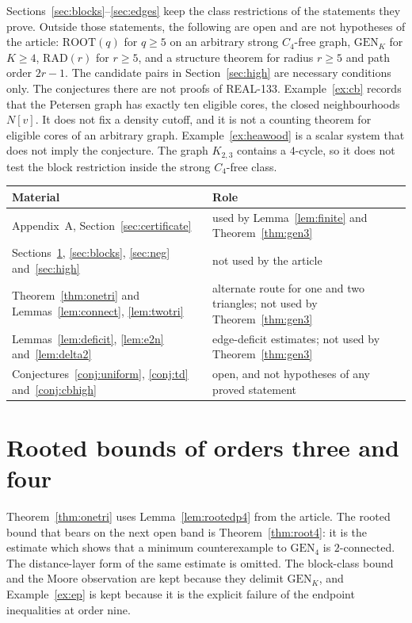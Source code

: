 \documentclass[ASNA]{USG}
\theoremstyle{WBstyletwo}
\numberwithin{equation}{section}
\newcommand{\GEN}{\mathrm{GEN}}
\newcommand{\RAD}{\mathrm{RAD}}
\newcommand{\ROOT}{\mathrm{ROOT}}
\begin{document}
Sections~\ref{sec:blocks}--\ref{sec:edges} keep the class restrictions of the statements they prove. Outside those statements, the following are open and are not hypotheses of the article: $\ROOT(q)$ for $q\ge 5$ on an arbitrary strong $C_4$-free graph, $\GEN_K$ for $K\ge 4$, $\RAD(r)$ for $r\ge 5$, and a structure theorem for radius $r\ge 5$ and path order $2r-1$. The candidate pairs in Section~\ref{sec:high} are necessary conditions only. The conjectures there are not proofs of REAL-133. Example~\ref{ex:cb} records that the Petersen graph has exactly ten eligible cores, the closed neighbourhoods $N[v]$. It does not fix a density cutoff, and it is not a counting theorem for eligible cores of an arbitrary graph. Example~\ref{ex:heawood} is a scalar system that does not imply the conjecture. The graph $K_{2,3}$ contains a $4$-cycle, so it does not test the block restriction inside the strong $C_4$-free class.

\begin{center}
\begin{tabular}{@{}p{7.4cm}p{6.6cm}@{}}
\toprule
Material & Role\\
\midrule
Appendix~A, Section~\ref{sec:certificate} & used by Lemma~\ref{lem:finite} and Theorem~\ref{thm:gen3}\\
Sections~\ref{sec:root3}, \ref{sec:blocks}, \ref{sec:neg} and~\ref{sec:high} & not used by the article\\
Theorem~\ref{thm:onetri} and Lemmas~\ref{lem:connect}, \ref{lem:twotri} & alternate route for one and two triangles; not used by Theorem~\ref{thm:gen3}\\
Lemmas~\ref{lem:deficit}, \ref{lem:e2n} and~\ref{lem:delta2} & edge-deficit estimates; not used by Theorem~\ref{thm:gen3}\\
Conjectures~\ref{conj:uniform}, \ref{conj:td} and~\ref{conj:cbhigh} & open, and not hypotheses of any proved statement\\
\bottomrule
\end{tabular}
\end{center}

\section{Rooted bounds of orders three and four}\label{sec:root3}

Theorem~\ref{thm:onetri} uses Lemma~\ref{lem:rootedp4} from the article. The rooted bound that bears on the next open band is Theorem~\ref{thm:root4}: it is the estimate which shows that a minimum counterexample to $\GEN_4$ is $2$-connected. The distance-layer form of the same estimate is omitted. The block-class bound and the Moore observation are kept because they delimit $\GEN_K$, and Example~\ref{ex:ep} is kept because it is the explicit failure of the endpoint inequalities at order nine.
\end{document}
